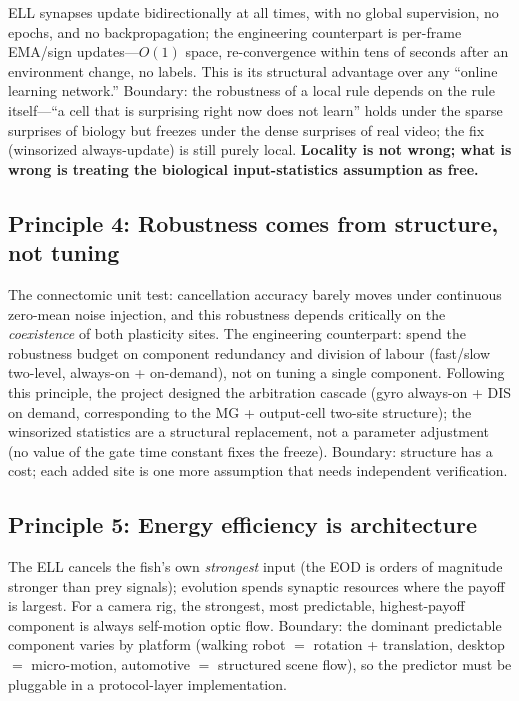 \documentclass[12pt,a4paper]{article}
\begin{document}
ELL synapses update bidirectionally at all times, with no global supervision, no epochs, and no backpropagation; the engineering counterpart is per-frame EMA/sign updates---$O(1)$ space, re-convergence within tens of seconds after an environment change, no labels. This is its structural advantage over any ``online learning network.'' Boundary: the robustness of a local rule depends on the rule itself---``a cell that is surprising right now does not learn'' holds under the sparse surprises of biology but freezes under the dense surprises of real video; the fix (winsorized always-update) is still purely local. \textbf{Locality is not wrong; what is wrong is treating the biological input-statistics assumption as free.}

\subsection{Principle 4: Robustness comes from structure, not tuning}

The connectomic unit test: cancellation accuracy barely moves under continuous zero-mean noise injection, and this robustness depends critically on the \emph{coexistence} of both plasticity sites. The engineering counterpart: spend the robustness budget on component redundancy and division of labour (fast/slow two-level, always-on + on-demand), not on tuning a single component. Following this principle, the project designed the arbitration cascade (gyro always-on + DIS on demand, corresponding to the MG + output-cell two-site structure); the winsorized statistics are a structural replacement, not a parameter adjustment (no value of the gate time constant fixes the freeze). Boundary: structure has a cost; each added site is one more assumption that needs independent verification.

\subsection{Principle 5: Energy efficiency is architecture}

The ELL cancels the fish's own \emph{strongest} input (the EOD is orders of magnitude stronger than prey signals); evolution spends synaptic resources where the payoff is largest. For a camera rig, the strongest, most predictable, highest-payoff component is always self-motion optic flow. Boundary: the dominant predictable component varies by platform (walking robot $=$ rotation + translation, desktop $=$ micro-motion, automotive $=$ structured scene flow), so the predictor must be pluggable in a protocol-layer implementation.
\end{document}
